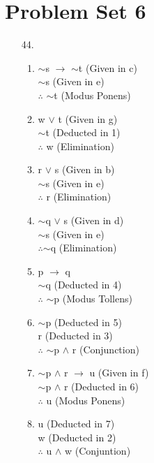 \documentclass[12pt]{article}
\begin{document}
\section*{Problem Set 6}
\begin{itemize}
    \item [44.]
        \begin{enumerate}
            \item
                $\sim$s $\rightarrow$ $\sim$t (Given in c)\\
                $\sim$s (Given in e)\\
                $\therefore$ $\sim$t (Modus Ponens)
            \item
                w $\vee$ t (Given in g) \\
                $\sim$t (Deducted in 1) \\
                $\therefore$ w (Elimination)
            \item
                r $\vee$ s (Given in b) \\
                $\sim$s (Given in e) \\
                $\therefore$ r (Elimination)
            \item 
                $\sim$q $\vee$ s (Given in d) \\
                $\sim$s (Given in e) \\
                $\therefore$$\sim$q (Elimination)
            \item
                p $\rightarrow$ q \\
                $\sim$q (Deducted in 4) \\
                $\therefore$ $\sim$p (Modus Tollens)
            \item 
                $\sim$p (Deducted in 5) \\
                r (Deducted in 3) \\
                $\therefore$ $\sim$p $\wedge$ r (Conjunction)
            \item
                $\sim$p $\wedge$ r $\rightarrow$ u (Given in f) \\
                $\sim$p $\wedge$ r (Deducted in 6) \\
                $\therefore$ u (Modus Ponens)
            \item
                u (Deducted in 7) \\
                w (Deducted in 2) \\
                $\therefore$ u $\wedge$ w (Conjuntion)
        \end{enumerate}
\end{itemize}
\end{document}
